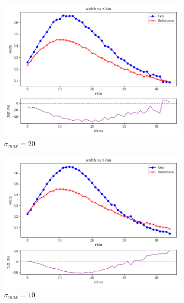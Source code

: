 \begin{figure}[bthp]
    \centering
    \begin{subfigure}[b]{0.23\textwidth}
        \centering
        \includegraphics[width=\textwidth]{Figures/ve20_4.png}
        \caption{$\sigma_{max}=20$}
        \label{fig:ve20_4}
    \end{subfigure}
    \hfill
    \begin{subfigure}[b]{0.23\textwidth}
        \centering
        \includegraphics[width=\textwidth]{Figures/ve10_4.png}
        \caption{$\sigma_{max}=10$}
        \label{fig:ve10_4}
    \end{subfigure}
    \hfill
    \begin{subfigure}[b]{0.23\textwidth}

\end{subfigure}
\end{figure}
